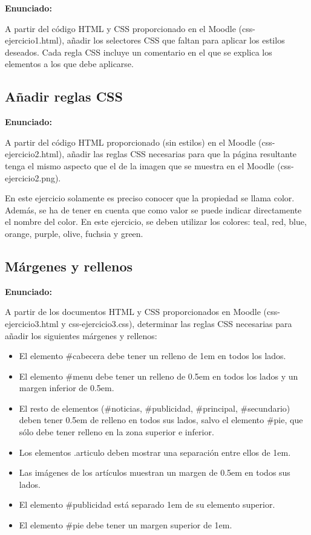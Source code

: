 \textbf{Enunciado:}

A partir del código HTML y CSS proporcionado en el Moodle (css-ejercicio1.html), añadir los selectores CSS que faltan para aplicar los estilos deseados. Cada regla CSS incluye un comentario en el que se explica los elementos a los que debe aplicarse.

\subsection{Añadir reglas CSS}
\label{subsec:anadir-reglas}

\textbf{Enunciado:}

A partir del código HTML proporcionado (sin estilos) en el Moodle (css-ejercicio2.html), añadir las reglas CSS necesarias para que la página resultante tenga el mismo aspecto que el de la imagen que se muestra en el Moodle (css-ejercicio2.png).

En este ejercicio solamente es preciso conocer que la propiedad se llama color. Además, se ha de tener en cuenta que como valor se puede indicar directamente el nombre del color. En este ejercicio, se deben utilizar los colores: teal, red, blue, orange, purple, olive, fuchsia y green.

\subsection{Márgenes y rellenos}
\label{subsec:margenes-rellenos}

\textbf{Enunciado:}

A partir de los documentos HTML y CSS proporcionados en Moodle (css-ejercicio3.html y css-ejercicio3.css), determinar las reglas CSS necesarias para añadir los siguientes márgenes y rellenos:

\begin{itemize}
  \item El elemento \#cabecera debe tener un relleno de 1em en todos los lados.
  \item El elemento \#menu debe tener un relleno de 0.5em en todos los lados y un margen inferior de 0.5em.
  \item El resto de elementos (\#noticias, \#publicidad, \#principal, \#secundario) deben tener 0.5em de relleno en todos sus lados, salvo el elemento \#pie, que sólo debe tener relleno en la zona superior e inferior.
  \item Los elementos .articulo deben mostrar una separación entre ellos de 1em.
  \item Las imágenes de los artículos muestran un margen de 0.5em en todos sus lados.
  \item El elemento \#publicidad está separado 1em de su elemento superior.
  \item El elemento \#pie debe tener un margen superior de 1em.
\end{itemize}

